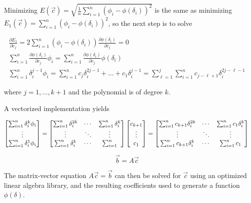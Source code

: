 Minimizing $E(\vec{c})=\sqrt{\frac{1}{n}\sum_{i=1}^n(\phi_i-\phi(\delta_i))^2}$ is the same as minimizing $E_1(\vec{c})=\sum_{i=1}^n(\phi_i-\phi(\delta_i))^2$, so the next step is to solve

\begin{gather}
    \frac{\partial E_1}{\partial c_j}=2\sum_{i=1}^n(\phi_i-\phi(\delta_i)) \frac{\partial \phi(\delta_i)}{\partial c_j}=0\\
    \sum_{i=1}^n\frac{\partial \phi(\delta_i)}{\partial c_j}\phi_i=\sum_{i=1}^n\frac{\partial \phi(\delta_i)}{\partial c_j}\phi(\delta_i)\\
    \sum_{i=1}^n \delta_i^{j-1}\phi_i=\sum_{i=1}^n c_j\delta_i^{2j-1}+\ldots+c_1\delta_i^{j-1}=\sum_{\ell=1}^j\sum_{i=1}^n c_{j-\ell+1}\delta_i^{2j-\ell-1}
\end{gather}

where $j=1,\ldots,k+1$ and the polynomial is of degree $k$.

A vectorized implementation yields

\begin{equation}
    \begin{bmatrix}\sum_{i=1}^n \delta_i^k\phi_i\\\vdots\\\sum_{i=1}^n \delta_i^1\phi_i\end{bmatrix}
    =\begin{bmatrix}\sum_{i=1}^n\delta_i^{2k}&\cdots&\sum_{i=1}^n\delta_i^{k}\\\vdots&\ddots&\vdots\\\sum_{i=1}^n \delta_i^{k}&\cdots&\sum_{i=1}^n\end{bmatrix}
    \begin{bmatrix}c_{k+1}\\\vdots\\c_1\end{bmatrix}
    =\begin{bmatrix}\sum_{i=1}^nc_{k+1}\delta_i^{2k}&\cdots&\sum_{i=1}^nc_1\delta_i^{k}\\\vdots&\ddots&\vdots\\\sum_{i=1}^n c_{k+1}\delta_i^{k}&\cdots&\sum_{i=1}^nc_1\end{bmatrix}\\
\end{equation}

\begin{equation}
    \vec{b}=A\vec{c}
\end{equation}

The matrix-vector equation $A\vec{c}=\vec{b}$ can then be solved for $\vec{c}$ using an optimized linear algebra library, and the resulting coefficients used to generate a function $\phi(\delta)$.


